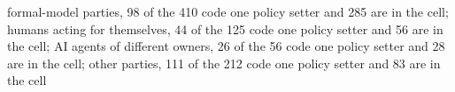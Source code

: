 formal-model parties, 98 of the 410 code one policy setter and 285 are in the cell; humans acting for themselves, 44 of the 125 code one policy setter and 56 are in the cell; AI agents of different owners, 26 of the 56 code one policy setter and 28 are in the cell; other parties, 111 of the 212 code one policy setter and 83 are in the cell